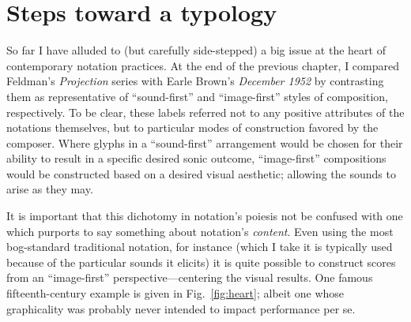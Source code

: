 \section{Steps toward a typology}


    So far I have alluded to (but carefully side-stepped) a big issue at the heart of contemporary notation practices. At the end of the previous chapter, I compared Feldman's \textit{Projection} series with Earle Brown's \textit{December 1952} by contrasting them as representative of ``sound-first'' and ``image-first'' styles of composition, respectively. To be clear, these labels referred not to any positive attributes of the notations themselves, but to particular modes of construction favored by the composer. Where glyphs in a ``sound-first'' arrangement would be chosen for their ability to result in a specific desired sonic outcome, ``image-first'' compositions would be constructed based on a desired visual aesthetic; allowing the sounds to arise as they may.
    
    
    It is important that this dichotomy in notation's poiesis not be confused with one which purports to say something about notation's \textit{content}. Even using the most bog-standard traditional notation, for instance (which I take it is typically used because of the particular sounds it elicits) it is quite possible to construct scores from an ``image-first'' perspective---centering the visual results. One famous fifteenth-century example is given in Fig.~\ref{fig:heart}; albeit one whose graphicality was probably never intended to impact performance per se.
    
